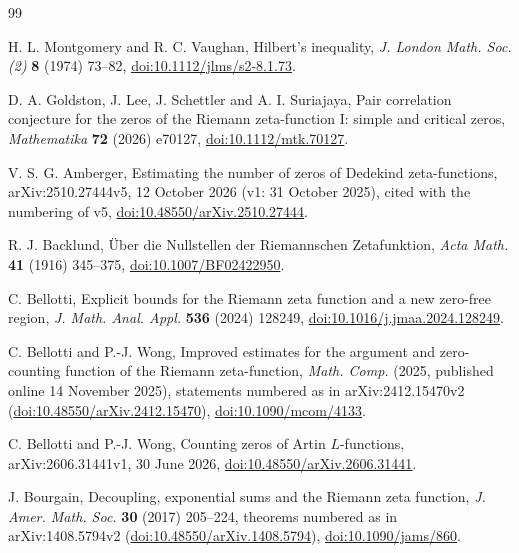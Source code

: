 \documentclass[11pt,reqno]{amsart}
\numberwithin{equation}{section}
\theoremstyle{definition}
\theoremstyle{remark}
\begin{document}
\begin{thebibliography}{99}

 H. L. Montgomery and R. C. Vaughan, Hilbert's inequality, \textit{J. London Math. Soc. (2)} \textbf{8} (1974) 73--82, \href{https://doi.org/10.1112/jlms/s2-8.1.73}{doi:10.1112/jlms/s2-8.1.73}.

 D. A. Goldston, J. Lee, J. Schettler and A. I. Suriajaya, Pair correlation conjecture for the zeros of the Riemann zeta-function I: simple and critical zeros, \textit{Mathematika} \textbf{72} (2026) e70127, \href{https://doi.org/10.1112/mtk.70127}{doi:10.1112/mtk.70127}.

 V. S. G. Amberger, Estimating the number of zeros of Dedekind zeta-functions, arXiv:2510.27444v5, 12 October 2026 (v1: 31 October 2025), cited with the numbering of v5, \href{https://doi.org/10.48550/arXiv.2510.27444}{doi:10.48550/arXiv.2510.27444}.

 R. J. Backlund, \"Uber die Nullstellen der Riemannschen Zetafunktion, \textit{Acta Math.} \textbf{41} (1916) 345--375, \href{https://doi.org/10.1007/BF02422950}{doi:10.1007/BF02422950}.

 C. Bellotti, Explicit bounds for the Riemann zeta function and a new zero-free region, \textit{J. Math. Anal. Appl.} \textbf{536} (2024) 128249, \href{https://doi.org/10.1016/j.jmaa.2024.128249}{doi:10.1016/j.jmaa.2024.128249}.

 C. Bellotti and P.-J. Wong, Improved estimates for the argument and zero-counting function of the Riemann zeta-function, \textit{Math. Comp.} (2025, published online 14 November 2025), statements numbered as in arXiv:2412.15470v2 (\href{https://doi.org/10.48550/arXiv.2412.15470}{doi:10.48550/arXiv.2412.15470}), \href{https://doi.org/10.1090/mcom/4133}{doi:10.1090/mcom/4133}.

 C. Bellotti and P.-J. Wong, Counting zeros of Artin $L$-functions, arXiv:2606.31441v1, 30 June 2026, \href{https://doi.org/10.48550/arXiv.2606.31441}{doi:10.48550/arXiv.2606.31441}.

 J. Bourgain, Decoupling, exponential sums and the Riemann zeta function, \textit{J. Amer. Math. Soc.} \textbf{30} (2017) 205--224, theorems numbered as in arXiv:1408.5794v2 (\href{https://doi.org/10.48550/arXiv.1408.5794}{doi:10.48550/arXiv.1408.5794}), \href{https://doi.org/10.1090/jams/860}{doi:10.1090/jams/860}.


\end{thebibliography}
\end{document}
